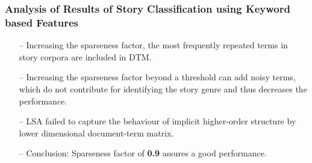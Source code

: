 \documentclass{beamer}
\begin{document}
\begin{frame}
\begin{table}[h]
\renewcommand{\arraystretch}{1.2}
\caption {\tiny Macro F1 measure for story classification using feature reduction techniques for Telugu\label{Table: Feature Reduction Telugu}} 
\end{table}	

\end{frame}


\begin{frame} \label{Keyword Result Analysis}
\frametitle{Analysis of Results of Story Classification using Keyword based Features}
\begin{itemize}
\item[--] Increasing the sparseness factor, the most frequently repeated terms in story corpora are included in DTM.
\item[--] Increasing the sparseness factor beyond a threshold can add noisy terms, which do not contribute for identifying the story genre and thus decreases the performance.
\item[--] LSA failed to capture the behaviour of implicit higher-order structure by lower dimensional document-term matrix. \hyperlink{LSA Analysis}{\beamergotobutton{}} 
\item[--] Conclusion: Sparseness factor of \textbf{0.9} assures a good performance.
\end{itemize}

\end{frame}
\end{document}

